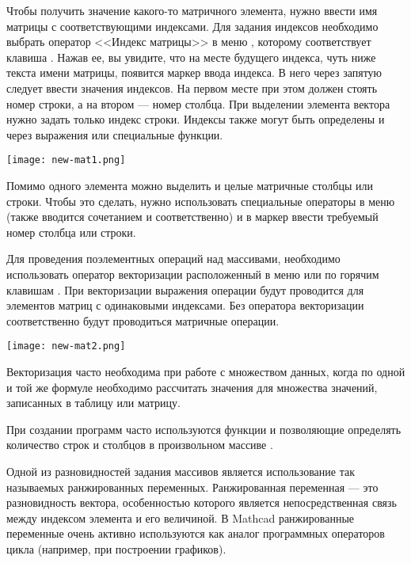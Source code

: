 Чтобы получить значение какого-то матричного элемента, нужно ввести имя матрицы с соответствующими индексами. Для задания индексов необходимо выбрать оператор <<Индекс матрицы>> в меню , которому соответствует клавиша \keys{[}. Нажав ее, вы увидите, что на месте будущего индекса, чуть ниже текста имени матрицы, появится маркер ввода индекса. В него через запятую следует ввести значения индексов. На первом месте при этом должен стоять номер строки, а на втором --- номер столбца. При выделении элемента вектора нужно задать только индекс строки. Индексы также могут быть определены и через выражения или специальные функции.
\begin{center}
	\texttt{[image: new-mat1.png]}
\end{center}


Помимо одного элемента можно выделить и целые матричные столбцы или строки. Чтобы это сделать, нужно использовать специальные операторы в меню  (также вводится сочетанием  и   соответственно)  и в маркер ввести требуемый номер столбца или строки.

Для проведения поэлементных операций над массивами, необходимо использовать оператор векторизации расположенный в меню  или по горячим клавишам \keys{\ctrl+\shift+\textasciicircum}. При векторизации выражения операции будут проводится для элементов матриц с одинаковыми индексами. Без оператора векторизации соответственно будут проводиться матричные операции.
\begin{center}
	\texttt{[image: new-mat2.png]}
\end{center}

Векторизация часто необходима при работе с множеством данных, когда по одной и той же формуле необходимо рассчитать значения для множества значений, записанных в таблицу или матрицу.

При создании программ часто используются функции  и  позволяющие определять количество строк и столбцов в произвольном массиве .


Одной из разновидностей задания массивов является использование так называемых ранжированных переменных. Ранжированная переменная --- это разновидность вектора, особенностью которого является непосредственная связь между индексом элемента и его величиной. В Mathcad ранжированные переменные очень активно используются как аналог программных операторов цикла (например, при построении графиков).

